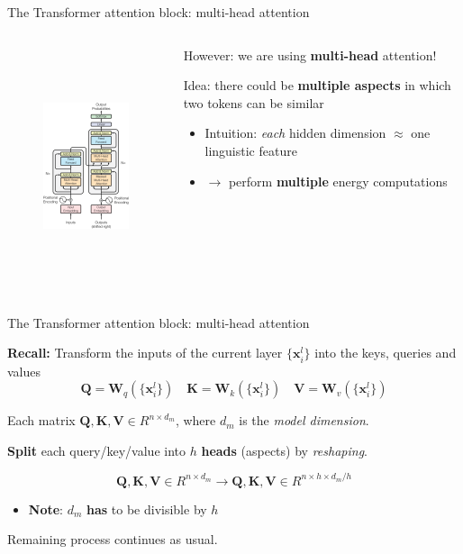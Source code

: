\documentclass[12pt,aspectratio=169,handout]{beamer}
\begin{document}
\begin{frame}{The Transformer attention block: multi-head attention}

		\begin{columns}[T]
		\begin{column}{.48\textwidth}
	
			\begin{figure}[h]
				\includegraphics[height=7cm]{anno_transformer}
			\end{figure}
			\end{column}
			\begin{column}{.48\textwidth}
				However: we are using \textbf{multi-head} attention!
				\vspace{1em}
				\pause

				Idea: there could be \textbf{multiple aspects} in which two tokens can be similar
				\pause
				\begin{itemize}
					\item Intuition: \textit{each} hidden dimension $\approx$ one linguistic feature
					\item $\to$ perform \textbf{multiple} energy computations  
				\end{itemize}
			\end{column}
		\end{columns}
	\end{frame}


\begin{frame}{The Transformer attention block: multi-head attention}

	\textbf{Recall:} Transform the inputs of the current layer $\{\bm{x}^l_i\}$ into the keys, queries and values
	$$
	\bm{Q} = \bm{W}_q (\{\bm{x}^l_i\}) \quad \bm{K} = \bm{W}_k (\{\bm{x}^l_i\}) \quad \bm{V} = \bm{W}_v (\{\bm{x}^l_i\})
	$$

	\pause
	Each matrix $\bm{Q}, \bm{K}, \bm{V} \in R^{n \times d_m}$, where $d_m$ is the \textit{model dimension}.

	\pause
	\textbf{Split} each query/key/value into $h$ \textbf{heads} (aspects) by \textit{reshaping}. 

	$$
		\bm{Q}, \bm{K}, \bm{V} \in R^{n \times d_m} \to \bm{Q}, \bm{K}, \bm{V} \in {R^{n \times h \times d_m/h}}
	$$
	\pause
	\begin{itemize}
		\item \textbf{Note}: $d_m$ \textbf{has} to be divisible by $h$
	\end{itemize}
	\pause 
	Remaining process continues as usual.

\end{frame}
\end{document}
